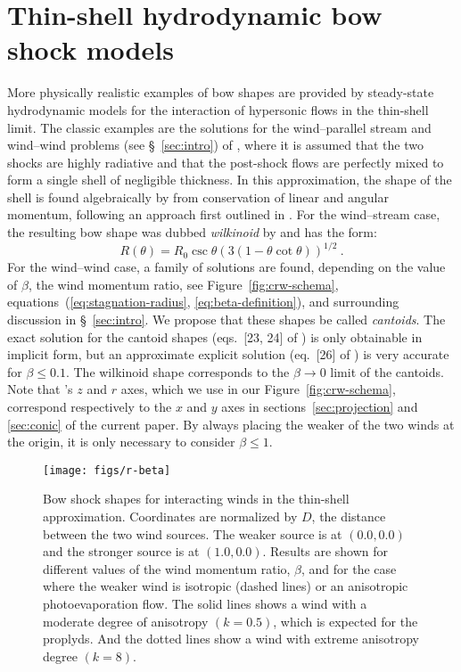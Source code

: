 \newcommand\thC{\(\theta^1\)\,Ori~C}
\newcommand\CRW{\citetalias{Canto:1996}}


\section{Thin-shell hydrodynamic bow shock models}
\label{sec:crw-scenario}

More physically realistic examples of bow shapes are provided by
steady-state hydrodynamic models for the interaction of hypersonic
flows in the thin-shell limit.  The classic examples are the solutions
for the wind--parallel stream and wind--wind problems (see
\S~\ref{sec:intro}) of \citet[][hereafter \CRW{}]{Canto:1996}, where
it is assumed that the two shocks are highly radiative and that the
post-shock flows are perfectly mixed to form a single shell of
negligible thickness. In this approximation, the shape of the shell is
found algebraically by \CRW{} from conservation of linear and angular
momentum, following an approach first outlined in
\citet{Wilkin:1996a}.  For the wind--stream case, the resulting bow
shape was dubbed \textit{wilkinoid} by \citet{Cox:2012a} and has the
form:
\begin{equation}
  \label{eq:wilkinoid-R-theta}
  R(\theta) = R_0\csc\theta\left( 3(1-\theta\cot\theta) \right)^{1/2} \ .
\end{equation}
For the wind--wind case, a family of solutions are found, depending on
the value of \(\beta\), the wind momentum ratio, see
Figure~\ref{fig:crw-schema}, equations~(\ref{eq:stagnation-radius},
\ref{eq:beta-definition}), and surrounding discussion in
\S~\ref{sec:intro}.  We propose that these shapes be called
\textit{cantoids}.  The exact solution for the cantoid shapes
(eqs.~[23, 24] of \CRW{}) is only obtainable in implicit form, but an
approximate explicit solution (eq.~[26] of \CRW{}) is very accurate
for \(\beta \le 0.1\).  The wilkinoid shape corresponds to the
\(\beta \to 0\) limit of the cantoids.  Note that \CRW{}'s \(z\) and
\(r\) axes, which we use in our Figure~\ref{fig:crw-schema},
correspond respectively to the \(x\) and \(y\) axes in
sections~\ref{sec:projection} and \ref{sec:conic} of the current
paper.  By always placing the weaker of the two winds at the origin,
it is only necessary to consider \(\beta \le 1\).
 

\begin{figure}
\texttt{[image: figs/r-beta]}
\caption{Bow shock shapes for interacting winds in the thin-shell
  approximation. Coordinates are normalized by $D$, the distance
  between the two wind sources.  The weaker source is at \((0.0, 0.0)\)
  and the stronger source is at \((1.0, 0.0)\).  Results are shown for
  different values of the wind momentum ratio, \(\beta\), and for the
  case where the weaker wind is isotropic (dashed lines) or an
  anisotropic photoevaporation flow. The solid lines shows a wind with a
  moderate degree of anisotropy $(k=0.5)$, which is expected for the proplyds.
  And the dotted lines show a wind with extreme anisotropy degree $(k=8)$.}
\label{fig:r-beta}
\end{figure}


